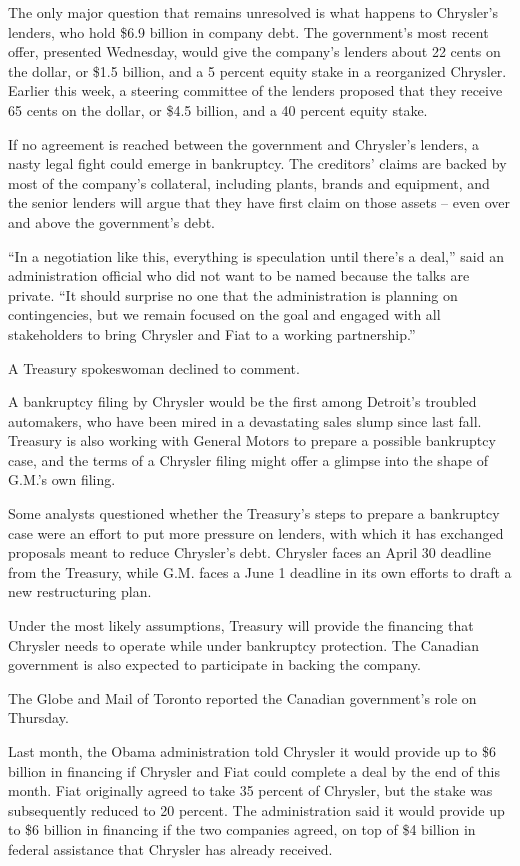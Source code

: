\documentclass[12pt,a4paper,onecolumn]{article}
\begin{document}
The only major question that remains unresolved is what happens to Chrysler's lenders, who hold
\$6.9 billion in company debt. The government's most recent offer, presented Wednesday, would give
the company's lenders about 22 cents on the dollar, or \$1.5 billion, and a 5 percent equity stake
in a reorganized Chrysler. Earlier this week, a steering committee of the lenders proposed that they
receive 65 cents on the dollar, or \$4.5 billion, and a 40 percent equity stake.

If no agreement is reached between the government and Chrysler's lenders, a nasty legal fight could
emerge in bankruptcy. The creditors' claims are backed by most of the company's collateral,
including plants, brands and equipment, and the senior lenders will argue that they have first claim
on those assets -- even over and above the government's debt.

``In a negotiation like this, everything is speculation until there's a deal,'' said an
administration official who did not want to be named because the talks are private. ``It should
surprise no one that the administration is planning on contingencies, but we remain focused on the
goal and engaged with all stakeholders to bring Chrysler and Fiat to a working partnership.''

A Treasury spokeswoman declined to comment.

A bankruptcy filing by Chrysler would be the first among Detroit's troubled automakers, who have
been mired in a devastating sales slump since last fall. Treasury is also working with General
Motors to prepare a possible bankruptcy case, and the terms of a Chrysler filing might offer a
glimpse into the shape of G.M.'s own filing.

Some analysts questioned whether the Treasury's steps to prepare a bankruptcy case were an effort to
put more pressure on lenders, with which it has exchanged proposals meant to reduce Chrysler's debt.
Chrysler faces an April 30 deadline from the Treasury, while G.M. faces a June 1 deadline in its own
efforts to draft a new restructuring plan.

Under the most likely assumptions, Treasury will provide the financing that Chrysler needs to
operate while under bankruptcy protection. The Canadian government is also expected to participate
in backing the company.

The Globe and Mail of Toronto reported the Canadian government's role on Thursday.

Last month, the Obama administration told Chrysler it would provide up to \$6 billion in financing
if Chrysler and Fiat could complete a deal by the end of this month. Fiat originally agreed to take
35 percent of Chrysler, but the stake was subsequently reduced to 20 percent. The administration
said it would provide up to \$6 billion in financing if the two companies agreed, on top of \$4
billion in federal assistance that Chrysler has already received.
\end{document}
